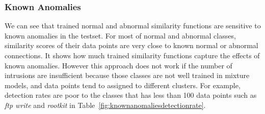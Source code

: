 \begin{table}[h]
\begin{center}
\end{center}
\caption{Detection result of sample data}
\label{fig:refSingleRobot1}
\end{table}

\subsubsection{Known Anomalies}
We can see that trained normal and abnormal similarity functions are sensitive to known anomalies in the testset.
For most of normal and abnormal classes, similarity scores of their data points are very close to known normal or abnormal connections. 
It shows how much trained similarity functions capture the effects of known anomalies. 
However this approach does not work if the number of intrusions are insufficient because those classes are not well trained in mixture models, and data points tend to assigned to different clusters. 
For example, detection rates are poor to the classes that has less than 100 data points such as \textit{ftp write} and \textit{rootkit} in Table~\ref{fig:knownanomaliesdetectionrate}. 

